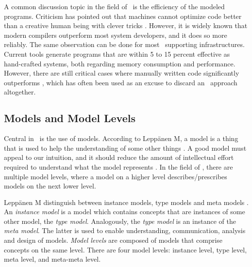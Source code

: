 A common discussion topic in the field of \mde~is the efficiency of the modeled programs. Criticism has pointed out that machines cannot optimize code better than a creative human being with clever tricks \cite{Selic2003-qa}. However, it is widely known that modern compilers outperform most system developers, and it does so more reliably. The same observation can be done for most \mdd~supporting infrastructures. Current tools generate programs that are within 5 to 15 percent effective as hand-crafted systems, both regarding memory consumption and performance. However, there are still critical cases where manually written code significantly outperforms \mde, which has often been used as an excuse to discard an \mdd~approach altogether.

\subsection{Models and Model Levels}
\label{sub:Models and Model Levels}
Central in \mde~is the use of models. According to Leppänen M, a model is a thing that is used to help the understanding of some other things \cite{Leppanen2006-ay}. A good model must appeal to our intuition, and it should reduce the amount of intellectual effort required to understand what the model represents \cite{Selic2003-qa}. In the field of \mdd, there are multiple model levels, where a model on a higher level describes/prescribes models on the next lower level. 

Leppänen M distinguish between instance models, type models and meta models \cite{Leppanen2006-ay}. An \textit{instance model} is a model which contains concepts that are instances of some other model, the \textit{type model}. Analogously, the \textit{type model} is an instance of the \textit{meta model}. The latter is used to enable understanding, communication, analysis and design of models. \textit{Model levels} are composed of models that comprise concepts on the same level. There are four model levels: instance level, type level, meta level, and meta-meta level.

